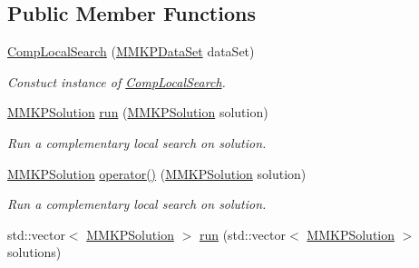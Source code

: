 \subsection*{Public Member Functions}
\begin{DoxyCompactItemize}
\item 
\hypertarget{class_comp_local_search_a99cb245fc7f02360218469ff4aa119c1}{\hyperlink{class_comp_local_search_a99cb245fc7f02360218469ff4aa119c1}{Comp\+Local\+Search} (\hyperlink{class_m_m_k_p_data_set}{M\+M\+K\+P\+Data\+Set} data\+Set)}\label{class_comp_local_search_a99cb245fc7f02360218469ff4aa119c1}

\begin{DoxyCompactList}\small\item\em Constuct instance of \hyperlink{class_comp_local_search}{Comp\+Local\+Search}. \end{DoxyCompactList}\item 
\hypertarget{class_comp_local_search_ad9a23295ab95fb5e554ca2db5a7e144e}{\hyperlink{class_m_m_k_p_solution}{M\+M\+K\+P\+Solution} \hyperlink{class_comp_local_search_ad9a23295ab95fb5e554ca2db5a7e144e}{run} (\hyperlink{class_m_m_k_p_solution}{M\+M\+K\+P\+Solution} solution)}\label{class_comp_local_search_ad9a23295ab95fb5e554ca2db5a7e144e}

\begin{DoxyCompactList}\small\item\em Run a complementary local search on solution. \end{DoxyCompactList}\item 
\hypertarget{class_comp_local_search_a8d604e198127268d04a52ca1c289800b}{\hyperlink{class_m_m_k_p_solution}{M\+M\+K\+P\+Solution} \hyperlink{class_comp_local_search_a8d604e198127268d04a52ca1c289800b}{operator()} (\hyperlink{class_m_m_k_p_solution}{M\+M\+K\+P\+Solution} solution)}\label{class_comp_local_search_a8d604e198127268d04a52ca1c289800b}

\begin{DoxyCompactList}\small\item\em Run a complementary local search on solution. \end{DoxyCompactList}\item 
\hypertarget{class_comp_local_search_a156e05e8cf63b414c4f76e5119660769}{std\+::vector$<$ \hyperlink{class_m_m_k_p_solution}{M\+M\+K\+P\+Solution} $>$ \hyperlink{class_comp_local_search_a156e05e8cf63b414c4f76e5119660769}{run} (std\+::vector$<$ \hyperlink{class_m_m_k_p_solution}{M\+M\+K\+P\+Solution} $>$ solutions)}\label{class_comp_local_search_a156e05e8cf63b414c4f76e5119660769}


\end{DoxyCompactItemize}
